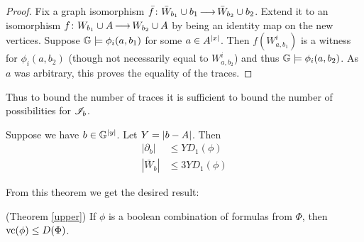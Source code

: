\begin{proof}
  Fix a graph isomorphism $\bar f \colon \bar W_{b_1} \cup b_1 \operatorname{\longrightarrow} \bar W_{b_2} \cup b_2$.
  Extend it to an isomorphism $f \colon W_{b_1} \cup A \operatorname{\longrightarrow} W_{b_2} \cup A$ by being an identity map on the new vertices.
  Suppose $\mathbb G \models \phi_i(a, b_1)$ for some $a \in A^{|x|}$.
  Then $f(W^i_{a, b_1})$ is a witness for  $\phi_i(a, b_2)$ (though not necessarily equal to $W^i_{a, b_2}$)
  and thus $\mathbb G \models \phi_i(a, b_2)$.
  As $a$ was arbitrary, this proves the equality of the traces.
\end{proof}

Thus to bound the number of traces it is sufficient to bound the number of possibilities for $\mathscr I_b$.

\begin{Theorem} \label{main_bound}
  Suppose we have $b \in \mathbb G^{|y|}$.
  Let $Y = \left|b - A\right|$.
  Then
  \begin{align*}
    |\partial_b| &\leq Y D_1(\phi) \\ 
    |\bar W_b| &\leq 3 Y D_1(\phi)
  \end{align*}
\end{Theorem}

From this theorem we get the desired result:
\begin{Corollary} (Theorem \ref{upper})
  If $\phi$ is a boolean combination of formulas from $\Phi$, then $\operatorname{vc}(\phi) \leq D(\Phi)$.
\end{Corollary}

